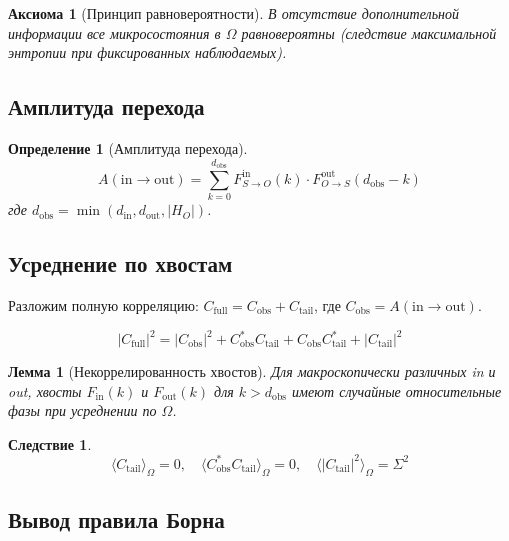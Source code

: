 \documentclass[11pt,a4paper]{article}
\newtheorem{definition}{Определение}[section]
\newtheorem{axiom}{Аксиома}[section]
\newtheorem{lemma}{Лемма}[section]
\newtheorem{corollary}{Следствие}[section]
\theoremstyle{definition}
\begin{document}
\begin{axiom}[Принцип равновероятности]
В отсутствие дополнительной информации все микросостояния в $\Omega$ равновероятны (следствие максимальной энтропии при фиксированных наблюдаемых).
\end{axiom}

\subsection{Амплитуда перехода}

\begin{definition}[Амплитуда перехода]
\begin{equation}
    A(\text{in} \to \text{out}) = \sum_{k=0}^{d_{\text{obs}}} F_{S \to O}^{\text{in}}(k) \cdot F_{O \to S}^{\text{out}}(d_{\text{obs}} - k)
\end{equation}
где $d_{\text{obs}} = \min(d_{\text{in}}, d_{\text{out}}, |H_O|)$.
\end{definition}

\subsection{Усреднение по хвостам}

Разложим полную корреляцию: $C_{\text{full}} = C_{\text{obs}} + C_{\text{tail}}$, где $C_{\text{obs}} = A(\text{in} \to \text{out})$.

\begin{equation}
    |C_{\text{full}}|^2 = |C_{\text{obs}}|^2 + C_{\text{obs}}^* C_{\text{tail}} + C_{\text{obs}} C_{\text{tail}}^* + |C_{\text{tail}}|^2
\end{equation}

\begin{lemma}[Некоррелированность хвостов]
Для макроскопически различных in и out, хвосты $F_{\text{in}}(k)$ и $F_{\text{out}}(k)$ для $k > d_{\text{obs}}$ имеют случайные относительные фазы при усреднении по $\Omega$.
\end{lemma}

\begin{corollary}
\begin{equation}
    \langle C_{\text{tail}} \rangle_\Omega = 0, \quad \langle C_{\text{obs}}^* C_{\text{tail}} \rangle_\Omega = 0, \quad \langle |C_{\text{tail}}|^2 \rangle_\Omega = \Sigma^2
\end{equation}
\end{corollary}

\subsection{Вывод правила Борна}
\end{document}
